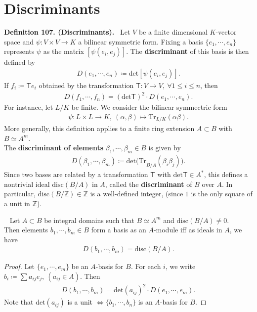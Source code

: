 \documentclass[12pt,a4paper,footinclude=true,headinclude=true]{scrbook} %
\newenvironment{proposition}[2][]
{\renewcommand\theinnercustomprop{#2}\innercustomprop[#1] 
\begin{mdframed}[backgroundcolor=gray!20]\ }
{\end{mdframed}\endinnercustomprop}
\newenvironment{definition}[2][Definition]
    { \begin{mdframed}[backgroundcolor=gray!20] \textbf{#1 #2.}\ }
    {  \end{mdframed}}
\begin{document}
\section{Discriminants}
\begin{definition}{107. (Discriminants)}
    Let $V$ be a finite dimensional $K$-vector space and $\psi:V\times V\to K$ a bilinear symmetric form. Fixing a basis $\{e_1,\cdots,e_n\}$ represents $\psi$ as the matrix $[\psi(e_i,e_j)]$. The \textbf{discriminant} of this basis is then defined by 
    \begin{align*}
        D(e_1,\cdots,e_n)\coloneqq\mathrm{det}[\psi(e_i,e_j)].
    \end{align*}
    If $f_i\coloneqq\mathsf{T}e_i$ obtained by the transformation $\mathsf{T}:V\to V,\ \forall1\leq i\leq n$, then 
    \begin{align*}
        D(f_1,\cdots,f_n)=(\mathrm{det}\mathsf{T})^2\cdot D(e_1,\cdots,e_n).
    \end{align*}
    For instance, let $L/K$ be finite. We consider the bilinear symmectric form
    \begin{align*}
        \psi:L\times L\to K,\ (\alpha,\beta)\mapsto \mathrm{Tr}_{L/K}(\alpha\beta).
    \end{align*}
    More generally, this definition applies to a finite ring extension $A\subset B$ with $B\simeq A^m$.\\ The \textbf{discriminant of elements} $\beta_1,\cdots,\beta_m\in B$ is given by 
    \begin{align*}
        D(\beta_1,\cdots,\beta_m)\coloneqq \mathrm{det(Tr}_{B/A}(\beta_i\beta_j)).
    \end{align*}
    Since two bases are related by a transformation $\mathsf{T}$ with $\mathrm{det}\mathsf{T}\in A^\ast$, this defines a nontrivial ideal $\mathrm{disc}(B/A)$ in $A$, called the \textbf{discriminant} of $B$ over $A$. In particular, $\mathrm{disc}(B/\mathbb{Z})\in\mathbb{Z}$ is a well-defined integer, (since $1$ is the only square of a unit in $\mathbb{Z}$).
\end{definition}

\begin{proposition}{108}
    Let $A\subset B$ be integral domains such that $B\simeq A^m$ and $\mathrm{disc}(B/A)\neq0$.\\ Then elements $b_1,\cdots,b_m\in B$ form a basis as an $A$-module iff as ideals in $A$, we have 
    \begin{align*}
        D(b_1,\cdots,b_m)= \mathrm{disc}(B/A).
    \end{align*}
\end{proposition}
\begin{proof}
    Let $\{e_1,\cdots,e_m\}$ be an $A$-basis for $B$. For each $i$, we write $b_i\coloneqq\sum a_{ij}e_j,\ (a_{ij}\in A)$. Then 
    \begin{align*}
        D(b_1,\cdots,b_m)= \mathrm{det}(a_{ij})^2\cdot D(e_1,\cdots,e_m).
    \end{align*}
    Note that $\mathrm{det}(a_{ij})$ is a unit $\Leftrightarrow \{b_1,\cdots,b_n\}$ is an $A$-basis for $B$.
\end{proof}
\end{document}

